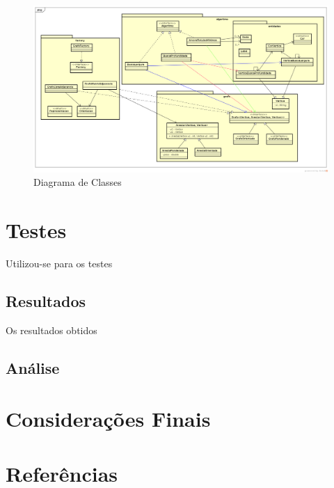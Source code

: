 \documentclass[12pt]{article}
\begin{document}
		\begin{landscape}
		\centering
		\begin{figure}[p]
		\includegraphics[width=1.4\textwidth]{ClassDiagram.png}
	\caption{Diagrama de Classes}
	\label{fig:classDiagram}
	\end{figure}
	\end{landscape}
	\restoregeometry

\section{Testes}\label{sec:testes}
	
	Utilizou-se para os testes 

	\subsection{Resultados}\label{sec:resultados}
		
		Os resultados obtidos 
		
	\subsection{Análise}\label{sec:analise}

\section{Considerações Finais}\label{sec:conclusao}

\section{Referências}\label{sec:referencia}
\end{document}
